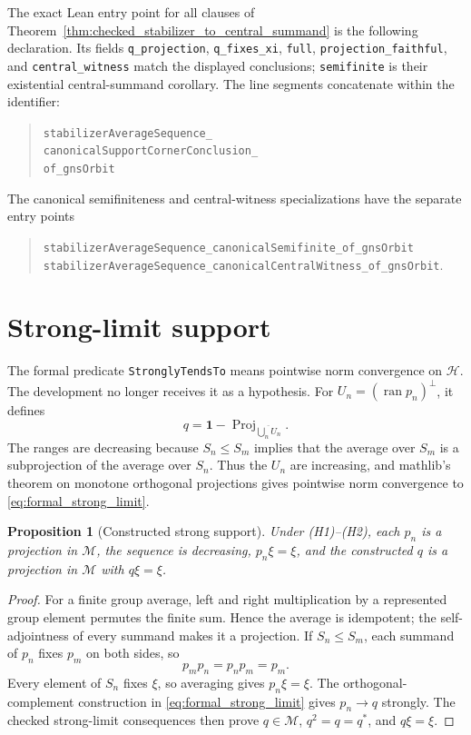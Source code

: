 \documentclass[11pt,reqno]{amsart}
\numberwithin{equation}{section}
\newtheorem{proposition}[theorem]{Proposition}
\theoremstyle{definition}
\theoremstyle{remark}
\newcommand{\cH}{\mathcal H}
\newcommand{\cM}{\mathcal M}
\newcommand{\id}{\mathbf 1}
\begin{document}
The exact Lean entry point for all clauses of
Theorem~\ref{thm:checked_stabilizer_to_central_summand} is the following
declaration.  Its fields \texttt{q\_projection},
\texttt{q\_fixes\_xi}, \texttt{full}, \texttt{projection\_faithful}, and
\texttt{central\_witness} match the displayed conclusions; \texttt{semifinite}
is their existential central-summand corollary.  The line segments concatenate
within the identifier:
\begin{quote}\small
\texttt{stabilizerAverageSequence\_}\\
\texttt{canonicalSupportCornerConclusion\_}\\
\texttt{of\_gnsOrbit}
\end{quote}
The canonical semifiniteness and central-witness specializations have the
separate entry points
\begin{quote}\small
\texttt{stabilizerAverageSequence\_canonicalSemifinite\_of\_gnsOrbit}\\
\texttt{stabilizerAverageSequence\_canonicalCentralWitness\_of\_gnsOrbit}.
\end{quote}

\section{Strong-limit support}
\label{sec:strong_support}

The formal predicate \texttt{StronglyTendsTo} means pointwise norm
convergence on $\cH$.  The development no longer receives it as a hypothesis.
For $U_n=(\operatorname{ran}p_n)^\perp$, it defines
\begin{equation}
  q=\id-\operatorname{Proj}_{\overline{\bigcup_n U_n}}.
  \label{eq:formal_strong_limit}
\end{equation}
The ranges are decreasing because $S_n\leq S_m$ implies that the average over
$S_m$ is a subprojection of the average over $S_n$.  Thus the $U_n$ are
increasing, and mathlib's theorem on monotone orthogonal projections gives
pointwise norm convergence to \eqref{eq:formal_strong_limit}.

\begin{proposition}[Constructed strong support]
\label{prop:strong_support_consequences}
Under (H1)--(H2), each $p_n$ is a projection in $\cM$, the sequence is
decreasing, $p_n\xi=\xi$, and the constructed $q$ is a projection in $\cM$
with $q\xi=\xi$.
\end{proposition}

\begin{proof}
For a finite group average, left and right multiplication by a represented
group element permutes the finite sum.  Hence the average is idempotent; the
self-adjointness of every summand makes it a projection.  If $S_n\leq S_m$,
each summand of $p_n$ fixes $p_m$ on both sides, so
\begin{equation}
  p_mp_n=p_np_m=p_m.
  \label{eq:stage_fixes_limit}
\end{equation}
Every element of $S_n$ fixes $\xi$, so averaging gives $p_n\xi=\xi$.  The
orthogonal-complement construction in \eqref{eq:formal_strong_limit} gives
$p_n\to q$ strongly.  The checked strong-limit consequences then prove
$q\in\cM$, $q^2=q=q^*$, and $q\xi=\xi$.
\end{proof}
\end{document}
